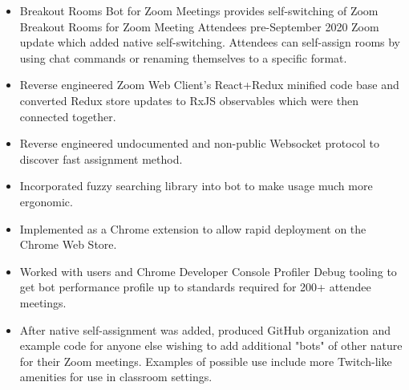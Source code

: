 \documentclass[10pt,letter,ragged2e]{altacv}
\begin{document}
\begin{paracol}{2}



\begin{itemize}
\item Breakout Rooms Bot for Zoom Meetings provides self-switching of Zoom Breakout Rooms for Zoom Meeting Attendees pre-September 2020 Zoom update which added native self-switching. Attendees can self-assign rooms by using chat commands or renaming themselves to a specific format.
\item Reverse engineered Zoom Web Client's React+Redux minified code base and converted Redux store updates to RxJS observables which were then connected together.
\item Reverse engineered undocumented and non-public Websocket protocol to discover fast assignment method.
\item Incorporated fuzzy searching library into bot to make usage much more ergonomic.
\item Implemented as a Chrome extension to allow rapid deployment on the Chrome Web Store.
\item Worked with users and Chrome Developer Console Profiler Debug tooling to get bot performance profile up to standards required for 200+ attendee meetings.
\item After native self-assignment was added, produced GitHub organization and example code for anyone else wishing to add additional "bots" of other nature for their Zoom meetings. Examples of possible use include more Twitch-like amenities for use in classroom settings.
\end{itemize}


\end{paracol}
\end{document}

